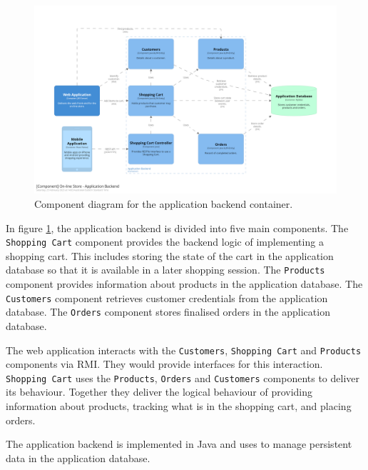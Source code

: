 \begin{figure}[h!]
    \centering
    \begin{adjustwidth}{-9mm}{-9mm}
        \includegraphics[trim=190 185 197 198,clip,width=0.965\paperwidth]{images/c4/appbackend_component_diagram.png}
    \end{adjustwidth}
    \caption{Component diagram for the application backend container.}
    \label{fig:c4_component_appbackend}
\end{figure}

In figure \ref{fig:c4_component_appbackend}, the application backend is divided into five main components.
The \texttt{Shopping Cart} component provides the backend logic of implementing a shopping cart.
This includes storing the state of the cart in the application database
so that it is available in a later shopping session.
The \texttt{Products} component provides information about products in the application database.
The \texttt{Customers} component retrieves customer credentials from the application database.
The \texttt{Orders} component stores finalised orders in the application database.

\noindent
The web application interacts with the \texttt{Customers}, \texttt{Shopping Cart} and \texttt{Products} components via RMI.
They would provide interfaces for this interaction.
\texttt{Shopping Cart} uses the \texttt{Products}, \texttt{Orders} and \texttt{Customers} components
to deliver its behaviour.
Together they deliver the logical behaviour of providing information about products,
tracking what is in the shopping cart, and placing orders.

The application backend is implemented in Java and uses
to manage persistent data in the application database.

